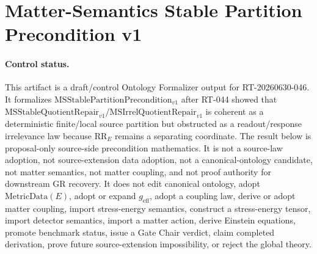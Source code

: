 \section*{Matter-Semantics Stable Partition Precondition v1}

\paragraph{Control status.}
This artifact is a draft/control Ontology Formalizer output for
RT-20260630-046. It formalizes
\(\mathrm{MSStablePartitionPrecondition}_{v1}\) after RT-044 showed that
\(\mathrm{MSStableQuotientRepair}_{v1}/
\mathrm{MSIrrelQuotientRepair}_{v1}\) is coherent as a deterministic
finite/local source partition but obstructed as a readout/response
irrelevance law because \(\mathrm{RR}_E\) remains a separating coordinate.
The result below is proposal-only source-side precondition mathematics. It is
not a source-law adoption, not source-extension data adoption, not a
canonical-ontology candidate, not matter semantics, not matter coupling, and
not proof authority for downstream GR recovery. It does not edit canonical
ontology, adopt \(\mathrm{MetricData}(E)\), adopt or expand
\(g_{\mathrm{eff}}\), adopt a coupling law, derive or adopt matter coupling,
import stress-energy semantics, construct a stress-energy tensor, import
detector semantics, import a matter action, derive Einstein equations,
promote benchmark status, issue a Gate Chair verdict, claim completed
derivation, prove future source-extension impossibility, or reject the global
theory.

\newcommand{\Bcur}{B_{\mathrm{cur}}}
\newcommand{\MSAdm}{\mathrm{MSAdm}_{v1}}
\newcommand{\MSStableRepair}{\mathrm{MSStableQuotientRepair}_{v1}}
\newcommand{\MSIrrelRepair}{\mathrm{MSIrrelQuotientRepair}_{v1}}
\newcommand{\MSStablePre}{\mathrm{MSStablePartitionPrecondition}_{v1}}
\newcommand{\MSSig}{\Sigma^{\mathrm{rep}}_E}
\newcommand{\MSRepEq}{\sim_{\mathrm{MSRep},E}}
\newcommand{\MSRepProj}{\pi^{\mathrm{rep}}_E}
\newcommand{\MSPart}{\Pi^{\mathrm{st}}_E}
\newcommand{\MSCell}{\mathcal C^{\mathrm{st}}_E}
\newcommand{\MSGuard}{G^{\mathrm{st}}_E}
\newcommand{\MSFail}{\mathrm{MSStablePartitionFailure}_{v1}}
\newcommand{\NoTarget}{\mathrm{NoTargetImport}_{v1}}
\newcommand{\NoDetector}{\mathrm{NoDetectorImport}_{v1}}
\newcommand{\NoSE}{\mathrm{NoStressEnergyImport}_{v1}}
\newcommand{\NoAction}{\mathrm{NoMatterActionImport}_{v1}}

\newtheorem{definition}{Definition}
\newtheorem{proposition}{Proposition}

